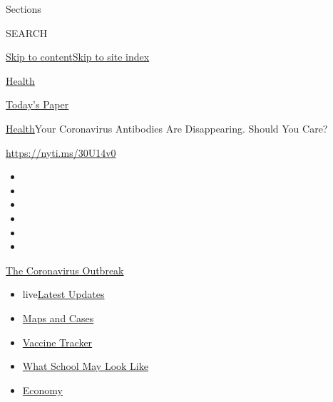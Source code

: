 Sections

SEARCH

\protect\hyperlink{site-content}{Skip to
content}\protect\hyperlink{site-index}{Skip to site index}

\href{https://www.nytimes.com/section/health}{Health}

\href{https://myaccount.nytimes.com/auth/login?response_type=cookie\&client_id=vi}{}

\href{https://www.nytimes.com/section/todayspaper}{Today's Paper}

\href{/section/health}{Health}\textbar{}Your Coronavirus Antibodies Are
Disappearing. Should You Care?

\url{https://nyti.ms/30U14v0}

\begin{itemize}
\item
\item
\item
\item
\item
\item
\end{itemize}

\href{https://www.nytimes.com/news-event/coronavirus?action=click\&pgtype=Article\&state=default\&region=TOP_BANNER\&context=storylines_menu}{The
Coronavirus Outbreak}

\begin{itemize}
\tightlist
\item
  live\href{https://www.nytimes.com/2020/08/01/world/coronavirus-covid-19.html?action=click\&pgtype=Article\&state=default\&region=TOP_BANNER\&context=storylines_menu}{Latest
  Updates}
\item
  \href{https://www.nytimes.com/interactive/2020/us/coronavirus-us-cases.html?action=click\&pgtype=Article\&state=default\&region=TOP_BANNER\&context=storylines_menu}{Maps
  and Cases}
\item
  \href{https://www.nytimes.com/interactive/2020/science/coronavirus-vaccine-tracker.html?action=click\&pgtype=Article\&state=default\&region=TOP_BANNER\&context=storylines_menu}{Vaccine
  Tracker}
\item
  \href{https://www.nytimes.com/interactive/2020/07/29/us/schools-reopening-coronavirus.html?action=click\&pgtype=Article\&state=default\&region=TOP_BANNER\&context=storylines_menu}{What
  School May Look Like}
\item
  \href{https://www.nytimes.com/live/2020/07/31/business/stock-market-today-coronavirus?action=click\&pgtype=Article\&state=default\&region=TOP_BANNER\&context=storylines_menu}{Economy}
\end{itemize}

